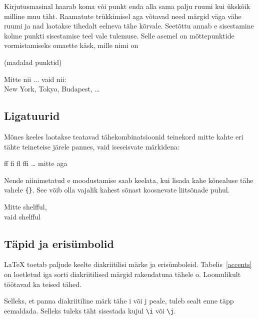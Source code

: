Kirjutusmasinal haarab koma või punkt enda alla sama palju ruumi kui
ükskõik milline muu täht. Raamatute trükkimisel aga võtavad need märgid
väga vähe ruumi ja nad laotakse tihedalt eelneva tähe kõrvale. Seetõttu
annab e sisestamine kolme punkti sisestamise teel vale
tulemuse. Selle asemel on mõttepunktide vormistamiseks omaette käsk,
mille nimi on

\begin{lscommand}
 (madalad punktid)
\end{lscommand}

\begin{example}
Mitte nii ... vaid nii:\\
New York, Tokyo, Budapest, \ldots
\end{example}

\subsection{Ligatuurid}

Mõnes keeles laotakse teatavad tähekombinatsioonid teinekord mitte
kahte eri tähte teineteise järele pannes, vaid iseseisvate märkidena:
\begin{code}
{\large ff fi fl ffi \ldots}\quad
mitte aga
\end{code}
Nende niinimetatud e moodustamise saab keelata, kui
lisada kahe kõnealuse tähe vahele \verb|{}|. See võib olla
vajalik kahest sõnast koosnevate liitsõnade puhul.
\begin{example}
\Large Mitte shelfful,\\
vaid shelf\mbox{}ful
\end{example}

\subsection{Täpid ja erisümbolid}

\LaTeX{} toetab paljude keelte diakriitilisi märke ja erisümboleid.
Tabelis~\ref{accents} on loetletud iga sorti diakriitilised märgid
rakendatuna tähele o. Loomulikult töötavad ka teised tähed.

Selleks, et panna diakriitiline märk tähe i või j peale, tuleb sealt
enne täpp eemaldada. Selleks tuleks täht sisestada kujul
\verb|\i| või
\verb|\j|.

